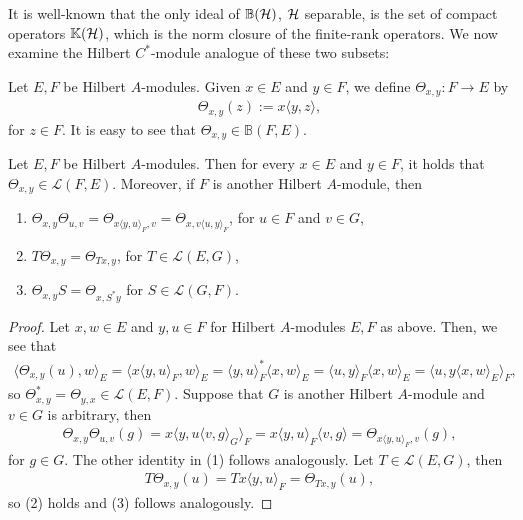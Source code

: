 It is well-known that the only ideal of $\mathbb{B}(\mathcal{H})$, $\mathcal{H}$ separable, is the set of compact operators $\mathbb{K}(\mathcal{H})$, which is the norm closure of the finite-rank operators. We now examine the Hilbert $C^*$-module analogue of these two subsets:
\begin{definition}
	Let $E,F$ be Hilbert $A$-modules. Given $x \in E$ and $y \in F$, we define $\Theta_{x,y} \colon F \to E$ by
	\begin{align*}
		\Theta_{x,y}(z):=x \langle y,z \rangle,
	\end{align*}
	for $z \in F$. It is easy to see that $\Theta_{x,y} \in \mathbb{B}(F,E)$. 
\end{definition}
\begin{proposition}
	Let $E,F$ be Hilbert $A$-modules. Then for every $x \in E$ and $y \in F$, it holds that $\Theta_{x,y} \in \mathcal{L}(F,E)$. Moreover, if $F$ is another Hilbert $A$-module, then
	\begin{enumerate}
		\item $\Theta_{x,y}\Theta_{u,v}=\Theta_{x \langle y,u \rangle_F,v} = \Theta_{x,v \langle u,y\rangle_F}$, for $u \in F$ and $v \in G$,
		\item $T \Theta_{x,y} = \Theta_{Tx,y}$, for $T \in \mathcal{L}(E,G)$,
		\item $\Theta_{x,y}S = \Theta_{x,S^* y}$ for $S \in \mathcal{L}(G,F)$.
	\end{enumerate}
	\label{frnkideal}
\end{proposition}
\begin{proof}
Let $x,w \in E$ and $y,u \in F$ for Hilbert $A$-modules $E,F$ as above. Then, we see that
\begin{align*}
		\langle \Theta_{x,y}(u),w\rangle_E = \langle x \langle y,u\rangle_{F}, w\rangle_{E} =  \langle y,u \rangle_F^* \langle x,w\rangle_E = \langle u,y \rangle_F \langle x,w\rangle_E = \langle u, y\langle x,w\rangle_E \rangle_F,
\end{align*}
so $\Theta_{x,y}^* = \Theta_{y,x} \in \mathcal{L}(E,F)$. Suppose that $G$ is another Hilbert $A$-module and $v \in G$ is arbitrary, then
\begin{align*}
	\Theta_{x,y}\Theta_{u,v}(g) = x \langle y, u \langle v,g \rangle_G \rangle_F = x \langle y, u \rangle_F \langle v,g \rangle=\Theta_{x \langle y,u \rangle_F, v}(g),
\end{align*}
for $g \in G$. The other identity in (1) follows analogously. Let $T \in \mathcal{L}(E,G)$, then
\begin{align*}
	T \Theta_{x,y}(u) = T x \langle y,u \rangle_F = \Theta_{Tx,y}(u),
\end{align*}
so (2) holds and (3) follows analogously.
\end{proof}
